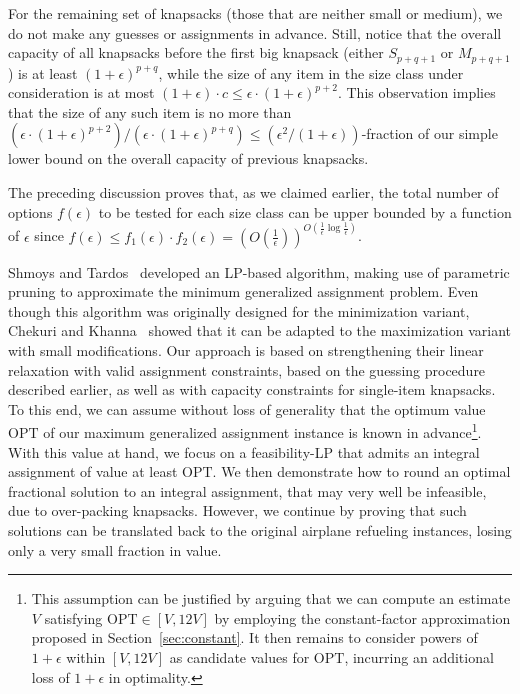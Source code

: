 \documentclass[11pt]{article}
\theoremstyle{plain}
\theoremstyle{definition}
\newcommand{\opt}{\mathrm{OPT}}
\begin{document}
\smallskip {} For the remaining set of knapsacks (those that are neither small or medium), we do not make any guesses or assignments in advance. Still, notice that the overall capacity of all knapsacks before the first big knapsack (either $S_{p+q+1}$ or $M_{p+q+1}$) is at least $(1+\epsilon)^{p+q}$, while the size of any item in the size class under consideration is at most $(1+\epsilon) \cdot c \leq \epsilon \cdot (1+\epsilon)^{p+2}$. This observation implies that the size of any such item is no more than $(\epsilon \cdot (1+\epsilon)^{p+2})/(\epsilon \cdot (1+\epsilon)^{p+q}) \leq (\epsilon^2/ (1+\epsilon))$-fraction of our simple lower bound on the overall capacity of previous knapsacks.

\smallskip The preceding discussion proves that, as we claimed earlier, the total number of options $f(\epsilon)$ to be tested for each size class can be upper bounded by a function of $\epsilon$ since $f(\epsilon) \leq f_1(\epsilon) \cdot f_2(\epsilon) = (O ( \frac{ 1 }{ \epsilon } ) )^{ O(\frac{ 1 }{ \epsilon } \log \frac{ 1 }{ \epsilon }) }$.

\smallskip {} Shmoys and Tardos~\cite{ShmoysT93} developed an LP-based algorithm, making use of parametric pruning to approximate the minimum generalized assignment problem. Even though this algorithm was originally designed for the minimization variant, Chekuri and Khanna~\cite{ChekuriK05} showed that it can be adapted to the maximization variant with small modifications. Our approach is based on strengthening their linear relaxation with valid assignment constraints, based on the guessing procedure described earlier, as well as with capacity constraints for single-item knapsacks. To this end, we can assume without loss of generality that the optimum value $\opt$ of our maximum generalized assignment instance is known in advance\footnote{This assumption can be justified by arguing that we can compute an estimate $V$ satisfying $\opt \in [V,12V]$ by employing the constant-factor approximation proposed in Section~\ref{sec:constant}. It then remains to consider powers of $1+\epsilon$ within $[V,12V]$ as candidate values for $\opt$, incurring an additional loss of $1+\epsilon$ in optimality.}. With this value at hand, we focus on a feasibility-LP that admits an integral assignment of value at least $\opt$. We then demonstrate how to round an optimal fractional solution to an integral assignment, that may very well be infeasible, due to over-packing knapsacks. However, we continue by proving that such solutions can be translated back to the original airplane refueling instances, losing only a very small fraction in value.
\end{document}
